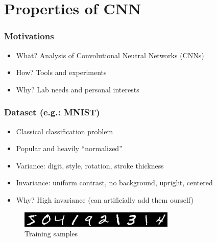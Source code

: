 \documentclass[10pt]{beamer}
\author{\docauthor}
\title{\docsubtitle}
\newcommand{\doctitle}{Properties of CNN}
\newcommand{\eg}{e.g.}
\begin{document}
\section{\doctitle}

\begin{frame}
    \frametitle{Motivations}
    \begin{itemize}
        \item What? Analysis of Convolutional Neutral Networks (CNNs)
        \item How? Tools and experiments
        \item Why? Lab needs and personal interests
    \end{itemize}
\end{frame}

\begin{frame}
    \frametitle{Dataset (\eg: MNIST)}
    \begin{itemize}
        \item Classical classification problem
        \item Popular and heavily ``normalized''
        \item Variance: digit, style, rotation, stroke thickness
        \item Invariance: uniform contrast, no background, upright, centered
        \item Why? High invariance (can artificially add them ourself)
    \end{itemize}

    \begin{figure}[h]
        \begin{center}
            \includegraphics{midpres_figures/mnist.png}
        \end{center}
        \caption{Training samples}
    \end{figure}
\end{frame}
\end{document}
